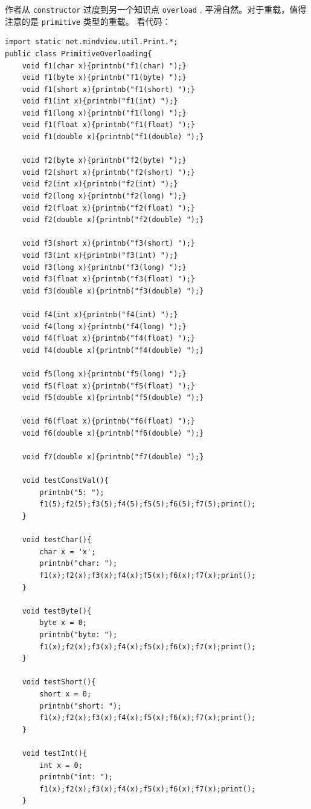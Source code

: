 \documentclass[10pt,a4paper,UTF8]{article}
\begin{document}
作者从 \texttt{constructor} 过度到另一个知识点 \texttt{overload} , 平滑自然。对于重载，值得注意的是 \texttt{primitive} 类型的重载。 看代码：
\begin{verbatim}
import static net.mindview.util.Print.*;
public class PrimitiveOverloading{
    void f1(char x){printnb("f1(char) ");}
    void f1(byte x){printnb("f1(byte) ");}
    void f1(short x){printnb("f1(short) ");}
    void f1(int x){printnb("f1(int) ");}
    void f1(long x){printnb("f1(long) ");}
    void f1(float x){printnb("f1(float) ");}
    void f1(double x){printnb("f1(double) ");}

    void f2(byte x){printnb("f2(byte) ");}
    void f2(short x){printnb("f2(short) ");}
    void f2(int x){printnb("f2(int) ");}
    void f2(long x){printnb("f2(long) ");}
    void f2(float x){printnb("f2(float) ");}
    void f2(double x){printnb("f2(double) ");}

    void f3(short x){printnb("f3(short) ");}
    void f3(int x){printnb("f3(int) ");}
    void f3(long x){printnb("f3(long) ");}
    void f3(float x){printnb("f3(float) ");}
    void f3(double x){printnb("f3(double) ");}

    void f4(int x){printnb("f4(int) ");}
    void f4(long x){printnb("f4(long) ");}
    void f4(float x){printnb("f4(float) ");}
    void f4(double x){printnb("f4(double) ");}

    void f5(long x){printnb("f5(long) ");}
    void f5(float x){printnb("f5(float) ");}
    void f5(double x){printnb("f5(double) ");}

    void f6(float x){printnb("f6(float) ");}
    void f6(double x){printnb("f6(double) ");}

    void f7(double x){printnb("f7(double) ");}

    void testConstVal(){
        printnb("5: ");
        f1(5);f2(5);f3(5);f4(5);f5(5);f6(5);f7(5);print();
    }

    void testChar(){
        char x = 'x';
        printnb("char: ");
        f1(x);f2(x);f3(x);f4(x);f5(x);f6(x);f7(x);print();
    }

    void testByte(){
        byte x = 0;
        printnb("byte: ");
        f1(x);f2(x);f3(x);f4(x);f5(x);f6(x);f7(x);print();
    }

    void testShort(){
        short x = 0;
        printnb("short: ");
        f1(x);f2(x);f3(x);f4(x);f5(x);f6(x);f7(x);print();
    }

    void testInt(){
        int x = 0;
        printnb("int: ");
        f1(x);f2(x);f3(x);f4(x);f5(x);f6(x);f7(x);print();
    }


\end{verbatim}
\end{document}
